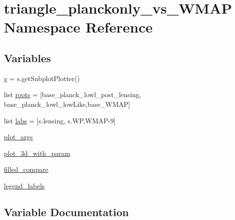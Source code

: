 \hypertarget{namespacetriangle__planckonly__vs__WMAP}{}\section{triangle\+\_\+planckonly\+\_\+vs\+\_\+\+W\+M\+AP Namespace Reference}
\label{namespacetriangle__planckonly__vs__WMAP}
\subsection*{Variables}
\begin{DoxyCompactItemize}
\item 
\mbox{\hyperlink{namespacetriangle__planckonly__vs__WMAP_ae547f4e2b95becb604d94b4aea9a1d0a}{g}} = s.\+get\+Subplot\+Plotter()
\item 
list \mbox{\hyperlink{namespacetriangle__planckonly__vs__WMAP_a7f2613dd92b6513d8ec3abf43ffaf4b4}{roots}} = \mbox{[}\textquotesingle{}base\+\_\+planck\+\_\+lowl\+\_\+post\+\_\+lensing\textquotesingle{}, \textquotesingle{}base\+\_\+planck\+\_\+lowl\+\_\+low\+Like\textquotesingle{},\textquotesingle{}base\+\_\+\+W\+M\+AP\textquotesingle{}\mbox{]}
\item 
list \mbox{\hyperlink{namespacetriangle__planckonly__vs__WMAP_ad24021584c2c585ba24a3ee6ee38042f}{labs}} = \mbox{[}s.\+lensing, s.\+WP,\textquotesingle{}W\+M\+AP-\/9\textquotesingle{}\mbox{]}
\item 
\mbox{\hyperlink{namespacetriangle__planckonly__vs__WMAP_a2f347d6bc7ed8561898ed3bf3b31b7e3}{plot\+\_\+args}}
\item 
\mbox{\hyperlink{namespacetriangle__planckonly__vs__WMAP_aab6d0b2d8ec496c84a646de155462bf6}{plot\+\_\+3d\+\_\+with\+\_\+param}}
\item 
\mbox{\hyperlink{namespacetriangle__planckonly__vs__WMAP_ab79333c2d464de15eae0e20dfbacd5a5}{filled\+\_\+compare}}
\item 
\mbox{\hyperlink{namespacetriangle__planckonly__vs__WMAP_a42c152209b204e0e91cd77ea2d5784f7}{legend\+\_\+labels}}
\end{DoxyCompactItemize}


\subsection{Variable Documentation}
\mbox{\label{namespacetriangle__planckonly__vs__WMAP_ab79333c2d464de15eae0e20dfbacd5a5}} 
